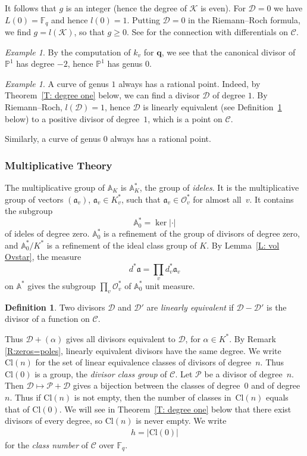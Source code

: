 \documentclass{amsart}
\renewcommand\P{\mathbb{P}}
\newcommand\F{\mathbb{F}}
\newcommand\q{\mathbf{q}}
\newcommand\oo{\mathcal{O}}
\newcommand\Curve{\mathcal{C}}
\newcommand\A{\mathbb{A}}
\newcommand\calD{\mathcal{D}}	\newcommand\calK{\mathcal{K}}
\newcommand\calP{\mathcal{P}}
\newcommand\Pic{\mathrm{Cl}}
\newcommand\gota{\mathfrak{a}}	\newcommand\gotb{\mathfrak{b}}
\theoremstyle{definition}\newtheorem{definition}[theorem]{Definition}
\theoremstyle{remark}\newtheorem{remark}[theorem]{Remark}
\newtheorem{example}[theorem]{Example}\newtheorem{exercise}[theorem]{Exercise}
\numberwithin{equation}{section}
\begin{document}
It follows that $g$ is an integer (hence the degree of $\calK$ is even).
For $\calD=0$ we have $L(0)=\F_q$ and hence $l(0)=1$.
Putting $\calD=0$ in the Riemann--Roch formula,
we find $g=l(\calK)$,
so that $g\geq0$.
See \cite{Artin,Stichtenoth} for the connection with differentials on $\Curve$.

\begin{example}
By the computation of $k_v$ for $\q$,
we see that the canonical divisor of $\P^1$ has degree $-2$,
hence $\P^1$ has genus $0$.
\end{example}

\begin{example}
A curve of genus $1$ always has a rational point.
Indeed,
by Theorem~\ref{T: degree one} below,
we can find a divisor $\calD$ of degree $1$.
By Riemann--Roch,
$l(\calD)=1$,
hence $\calD$ is linearly equivalent (see Definition~\ref{D:lin eq} below) to a positive divisor of degree~$1$,
which is a point on $\Curve$.

Similarly,
a curve of genus $0$ always has a rational point.
\end{example}

\subsubsection{Multiplicative Theory}
\label{S:multiplicative theory}

The multiplicative group of $\A_K$ is $\A^*_K$,
the group of {\em ideles}.
It is the multiplicative group of vectors $(\gota_v)$,
$\gota_v\in K_v^*$,
such that $\gota_v\in\oo_v^*$ for almost all~$v$.
It contains the subgroup
$$
\A^*_0=\ker|\cdot|
$$
of ideles of degree zero.
$\A^*_0$ is a refinement of the group of divisors of degree zero,
and $\A^*_0/K^*$ is a refinement of the ideal class group of $K$.
By Lemma~\ref{L: vol Ovstar},
the measure
$$
d^*\gota=\prod_v d^*_v\gota_v
$$
on $\A^*$ gives the subgroup $\prod_v\oo_v^*$ of $\A_0^*$ unit measure.

\begin{definition}\label{D:lin eq}
Two divisors $\calD$ and $\calD'$ are {\em linearly equivalent\/} if $\calD-\calD'$ is the divisor of a function on\/ $\Curve$.
\end{definition}

Thus $\calD+(\alpha)$ gives all divisors equivalent to $\calD$,
for $\alpha\in K^*$.
By Remark \ref{R:zeros=poles},
 linearly equivalent divisors have the same degree.
We write~\mbox{$\Pic(n)$} for the set of linear equivalence classes of divisors of degree~$n$.
Thus~\mbox{$\Pic(0)$} is a group,
the {\em divisor class group\/} of $\Curve$.
Let $\calP$ be a divisor of degree~$n$.
Then $\calD\mapsto\calP+\calD$ gives a bijection between the classes of degree~$0$ and of degree~$n$.
Thus if $\Pic(n)$ is not empty,
then the number of classes in~$\Pic(n)$ equals that of $\Pic(0)$.
We will see in Theorem~\ref{T: degree one} below that there exist divisors of every degree,
so $\Pic(n)$ is never empty.
We write
\begin{gather*}
h=|\Pic(0)|
\end{gather*}
for the {\em class number\/} of $\Curve$ over $\F_q$.
\end{document}
